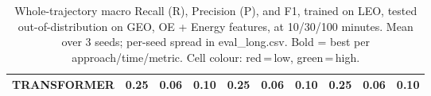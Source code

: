 \begin{table}[t]
{\begin{tabular}{l ccc ccc ccc}
\textbf{TRANSFORMER} & \cellcolor[HTML]{FF6B6B}0.25 & \cellcolor[HTML]{FF6B6B}0.06 & \cellcolor[HTML]{FF6B6B}0.10 & \cellcolor[HTML]{FF6B6B}0.25 & \cellcolor[HTML]{FF6B6B}0.06 & \cellcolor[HTML]{FF6B6B}0.10 & \cellcolor[HTML]{FF6B6B}0.25 & \cellcolor[HTML]{FF6B6B}0.06 & \cellcolor[HTML]{FF6B6B}0.10 \\
\bottomrule
\end{tabular}%
}
\caption{Whole-trajectory macro Recall (R), Precision (P), and F1, trained on LEO, tested out-of-distribution on GEO, OE + Energy features, at 10/30/100 minutes. Mean over 3 seeds; per-seed spread in eval\_long.csv. Bold = best per approach/time/metric. Cell colour: red\,=\,low, green\,=\,high.}
\label{tab:total_leo_to_geo_phys}
\end{table}
